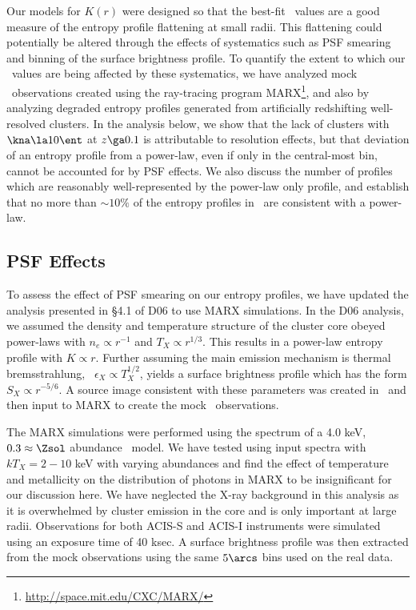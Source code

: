 Our models for $K(r)$ were designed so that the best-fit \kna\ values
are a good measure of the entropy profile flattening at small
radii. This flattening could potentially be altered through the
effects of systematics such as PSF smearing and binning of the surface
brightness profile. To quantify the extent to which our
\kna\ values are being affected by these systematics, we have analyzed
mock \chandra\ observations created using the ray-tracing program
MARX\footnote{\url{http://space.mit.edu/CXC/MARX/}}, and also by
analyzing degraded entropy profiles generated from artificially
redshifting well-resolved clusters. In the analysis below, we show
that the lack of clusters with $\kna \la 10 \ent$ at $z \ga 0.1$ is
attributable to resolution effects, but that deviation of an entropy
profile from a power-law, even if only in the central-most bin, cannot
be accounted for by PSF effects. We also discuss the number of
profiles which are reasonably well-represented by the power-law only
profile, and establish that no more than $\sim 10\%$ of the entropy
profiles in \accept\ are consistent with a power-law.

\subsection{PSF Effects}
\label{sec:entsupppsf}

To assess the effect of PSF smearing on our entropy profiles, we have
updated the analysis presented in \S4.1 of D06 to use MARX
simulations. In the D06 analysis, we assumed the density and
temperature structure of the cluster core obeyed power-laws with $n_e
\propto r^{-1}$ and $T_X \propto r^{1/3}$. This results in a power-law
entropy profile with $K \propto r$. Further assuming the main emission
mechanism is thermal bremsstrahlung, \ie\ $\epsilon_X \propto
T_X^{1/2}$, yields a surface brightness profile which has the form
$S_X \propto r^{-5/6}$. A source image consistent with these
parameters was created in \idl\ and then input to MARX to create the
mock \chandra\ observations.

The MARX simulations were performed using the spectrum of a 4.0 keV,
$0.3 \approx \Zsol$ abundance \mekal\ model. We have tested using
input spectra with $kT_X = 2-10$ keV with varying abundances and find
the effect of temperature and metallicity on the distribution of
photons in MARX to be insignificant for our discussion here. We have
neglected the X-ray background in this analysis as it is overwhelmed
by cluster emission in the core and is only important at large
radii. Observations for both ACIS-S and ACIS-I instruments were
simulated using an exposure time of 40 ksec. A surface brightness
profile was then extracted from the mock observations using the same
$5\arcs$ bins used on the real data.

